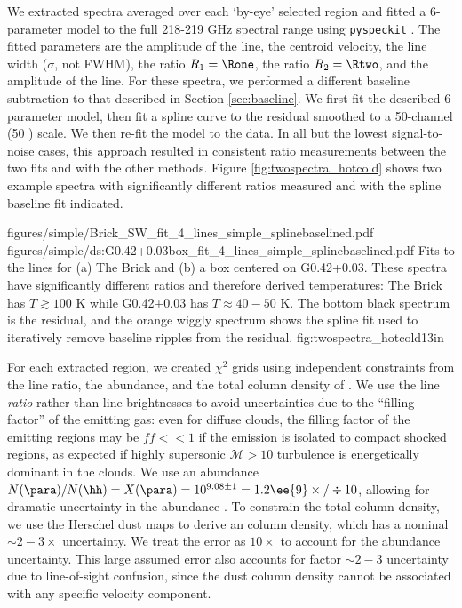We extracted spectra averaged over each `by-eye' selected region and fitted
a 6-parameter model to the full 218-219 GHz spectral range using
\texttt{pyspeckit} \citep{Ginsburg2011c}.  The fitted parameters are the amplitude of the
\formaldehyde \threeohthree line, the centroid velocity, the line width
($\sigma$, not FWHM), the ratio $R_1 = \Rone$, the ratio $R_2 = \Rtwo$, and the
amplitude of the \methanol \fourtwotwo line.  For these spectra, we performed
a different baseline subtraction to that described in Section
\ref{sec:baseline}.  We first fit the described 6-parameter model, then fit a
spline curve to the residual smoothed to a 50-channel (50 \kms) scale.  We then
re-fit the model to the data.  In all but the lowest signal-to-noise cases,
this approach resulted in consistent ratio measurements between the two fits
and with the other methods.  Figure \ref{fig:twospectra_hotcold} shows two example
spectra with significantly different ratios measured and with the spline baseline
fit indicated.

\FigureTwo
{figures/simple/Brick_SW_fit_4_lines_simple_splinebaselined.pdf}
{figures/simple/ds:G0.42+0.03box_fit_4_lines_simple_splinebaselined.pdf}
{
Fits to the \para lines for (a) The Brick and (b) a box centered on G0.42+0.03.
These spectra have significantly different ratios and therefore derived temperatures:
The Brick has $T\gtrsim100$ K while G0.42+0.03 has $T\approx40-50$ K.
The bottom black spectrum is the residual, and the orange wiggly spectrum shows
the spline fit used to iteratively remove baseline ripples from the residual.}
{fig:twospectra_hotcold}{1}{3in}


For each extracted region, we created $\chi^2$ grids using independent
constraints from the line ratio, the \formaldehyde abundance, and the total
column density of \hh.  We use the line \emph{ratio} rather than line
brightnesses to avoid uncertainties due to the ``filling factor'' of the
emitting gas: even for diffuse clouds, the filling factor of the emitting
regions may be $ff<<1$ if the emission is isolated to compact shocked regions,
as expected if highly supersonic $\mathcal{M}>10$ turbulence is energetically
dominant in the clouds.  We use an abundance $N(\para)/N(\hh) = X(\para) =
10^{9.08\pm1} = 1.2\ee{9} \times/\div 10$, allowing for dramatic uncertainty in
the \formaldehyde abundance
\citep{Ginsburg2013a,Carey1998a,Wootten1978a,Mundy1987a}.  To constrain the
total column density, we use the Herschel dust maps to derive an \hh column
density, which has a nominal $\sim2-3\times$ uncertainty.  We treat the error
as $10\times$ to account for the abundance uncertainty.  This large assumed
error also accounts for factor $\sim2-3$ uncertainty due to line-of-sight
confusion, since the dust column density cannot be associated with any specific
velocity component.

